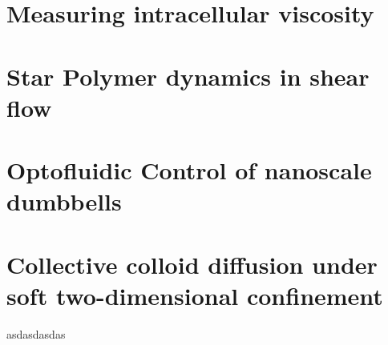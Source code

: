 \chapter{Measuring intracellular viscosity}
\chapter{Star Polymer dynamics in shear flow}
\chapter{Optofluidic Control of nanoscale dumbbells}
\chapter{Collective colloid diffusion under soft two-dimensional confinement}

asdasdasdas